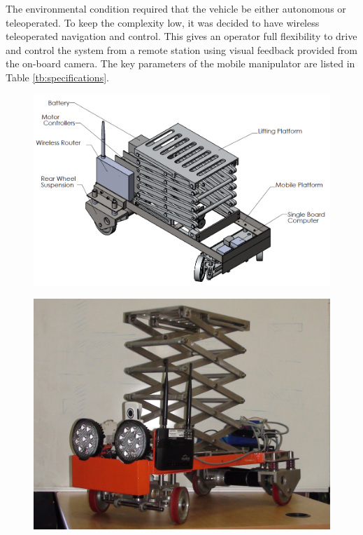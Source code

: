  The environmental condition required that the vehicle be either  autonomous or teleoperated. To keep the complexity low, it was decided to have wireless teleoperated   navigation and control. This gives an  operator full flexibility to drive  and control the system from a remote station  using  visual  feedback provided from the on-board camera. The key parameters of the mobile manipulator are listed in  Table \ref{tb:specifications}.

\begin{figure}[h]
	\centering
	\includegraphics[width=\linewidth,keepaspectratio]{Chapter3/fig/robo3Dmodel}
	\label{fig:robo3Dmodel}
\end{figure}
\begin{figure}[h]
 		\centering
		\includegraphics[width=.8\linewidth,keepaspectratio]{Chapter3/fig/roboActual}
		\label{fig:roboActual}
\end{figure}

